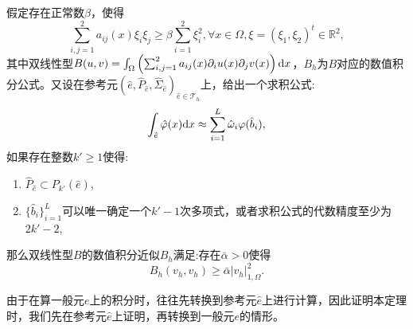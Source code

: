 \begin{theorem}
    假定存在正常数$\beta$，使得
    \begin{equation}
        \sum_{i,j=1}^{2}a_{ij}(x)\xi_{i}\xi_{j}\ge\beta\sum_{i=1}^{2}\xi_{i}^{2},\forall x\in\Omega,\xi=(\xi_{1},\xi_{2})^{t}\in \mathbb{R}^{2},
    \end{equation}
    其中双线性型$B(u,v)=\int_{\Omega}\left(\sum_{i,j=1}^{2}a_{ij}(x)\partial_{i}u(x)\partial_{j}v(x)\right)\mathrm{d} x$，$B_{h}$为$B$对应的数值积分公式。又设在参考元$(\hat{e},\hat{P}_{\hat{e}},\hat{\Sigma}_{\hat{e}})_{\hat{e}\in \mathcal{T}_{h}}$上，给出一个求积公式:
    \begin{equation}
        \label{eq:ref_elem_quad}
        \int_{\hat{e}}\hat{\varphi}(x)\mathrm{d} x\approx\sum_{i=1}^{L}\hat{\omega}_{i}\varphi(\hat{b}_{i}),
    \end{equation}
    如果存在整数$k'\ge 1$使得:
    \begin{enumerate}
        \item $\hat{P}_{\hat{e}}\subset P_{k'}(\hat{e})$,
        \item $\{\hat{b}_{i}\}_{i=1}^{L}$可以唯一确定一个$k'-1$次多项式，或者求积公式的代数精度至少为$2k'-2$,
    \end{enumerate}
    那么双线性型$B$的数值积分近似$B_{h}$满足:存在$\bar{\alpha}>0$使得
    \begin{equation}
        B_{h}(v_{h},v_{h})\ge\bar{\alpha}|v_{h}|_{1,\Omega}^{2}.
    \end{equation}
\end{theorem}
\begin{remark}
    由于在算一般元$e$上的积分时，往往先转换到参考元$\hat{e}$上进行计算，因此证明本定理时，我们先在参考元$\hat{e}$上证明，再转换到一般元$e$的情形。
\end{remark}
